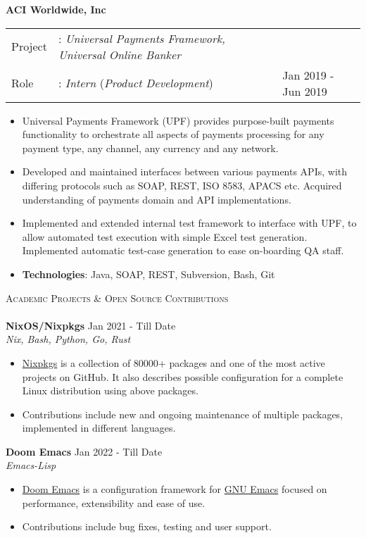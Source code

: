 \documentclass[a4paper]{article}
\newcommand{\lineunder} {
    \vspace*{-8pt} \\
    \hspace*{-18pt} \hrulefill \\
}
\newcommand{\header} [1] {
    {\hspace*{-18pt}\vspace*{6pt} \textsc{#1}}
    \vspace*{-6pt} \lineunder
}
\begin{document}
\textbf{ACI Worldwide, Inc} \\
\begin{tabularx}{\textwidth}{ l l>{\raggedleft\arraybackslash}X}
  Project & : \textit{Universal Payments Framework, Universal Online Banker } & \\
  Role & : \textit{Intern} (\textit{Product Development}) & Jan 2019 - Jun 2019\\
\end{tabularx}
\begin{itemize} \itemsep 1pt
  \item Universal Payments Framework (UPF) provides purpose-built payments functionality to orchestrate all aspects of payments processing for any payment type, any channel, any currency and any network.
  \item Developed and maintained interfaces between various payments APIs, with differing protocols such as SOAP, REST, ISO 8583, APACS etc. Acquired understanding of payments domain and API implementations.
  \item Implemented and extended internal test framework to interface with UPF, to allow automated test execution with simple Excel test generation. Implemented automatic test-case generation to ease on-boarding QA staff.
  \item \textbf{Technologies}: Java, SOAP, REST, Subversion, Bash, Git
\end{itemize}
\vspace{1mm}

\header{Academic Projects \& Open Source Contributions}
\vspace{1mm}
{\textbf{NixOS/Nixpkgs}} \hfill Jan 2021 - Till Date \\
\textit{Nix, Bash, Python, Go, Rust} \\
\begin{itemize}
  \item \href{https://github.com/NixOS/nixpkgs/}{Nixpkgs} is a collection of 80000+ packages and one of the most active projects on GitHub. It also describes possible configuration for a complete Linux distribution using above packages.
  \item Contributions include new and ongoing maintenance of multiple packages, implemented in different languages.
\end{itemize}
\vspace*{2mm}

{\textbf{Doom Emacs}} \hfill Jan 2022 - Till Date \\
\textit{Emacs-Lisp} \\
\begin{itemize}
  \item \href{https://github.com/doomemacs/doomemacs}{Doom Emacs} is a configuration framework for \href{https://www.gnu.org/software/emacs/}{GNU Emacs} focused on performance, extensibility and ease of use. \\
  \item Contributions include bug fixes, testing and user support.\\
\end{itemize}
\vspace*{2mm}
\end{document}
